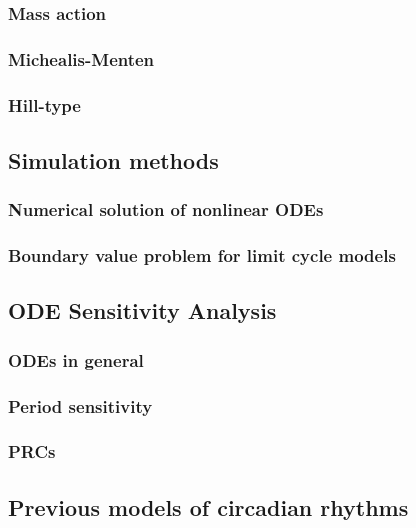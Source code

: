 \subsubsection{Mass action}\blindtext
\subsubsection{Michealis-Menten}\blindtext
\subsubsection{Hill-type}\blindtext
\subsection{Simulation methods}\blindtext
\subsubsection{Numerical solution of nonlinear ODEs}\blindtext
\subsubsection{Boundary value problem for limit cycle models}\blindtext
\subsection{ODE Sensitivity Analysis}\blindtext
\subsubsection{ODEs in general}\blindtext
\subsubsection{Period sensitivity}\blindtext
\subsubsection{PRCs}\blindtext
\subsection{Previous models of circadian rhythms}\blindtext
